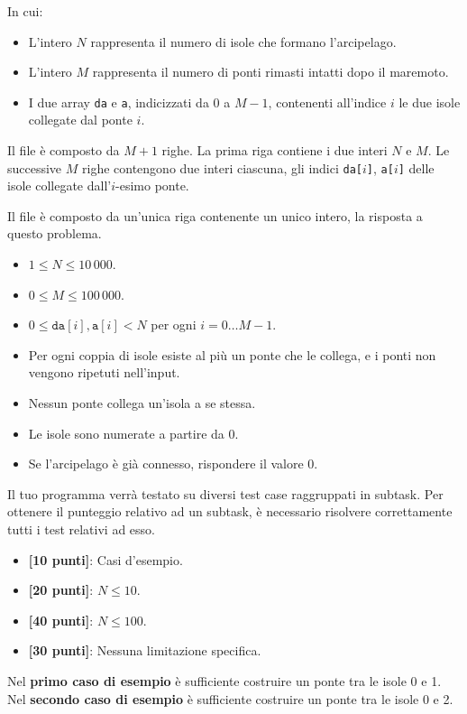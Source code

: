 In cui:
\begin{itemize}[nolistsep]
  \item L'intero $N$ rappresenta il numero di isole che formano l'arcipelago.
  \item L'intero $M$ rappresenta il numero di ponti rimasti intatti dopo il maremoto.
  \item I due array \texttt{da} e \texttt{a}, indicizzati da $0$ a $M-1$, contenenti all'indice $i$ le due isole collegate dal ponte $i$.
\end{itemize}

\InputFile
Il file  è composto da $M+1$ righe. La prima riga contiene i due interi $N$ e $M$. Le successive $M$ righe contengono due interi ciascuna, gli indici \texttt{da[$i$]}, \texttt{a[$i$]} delle isole collegate dall'$i$-esimo ponte.

\OutputFile
Il file \outputfile{} è composto da un'unica riga contenente un unico intero, la risposta a questo problema.

\Constraints
\begin{itemize}[nolistsep, itemsep=2mm]
	\item $1 \le N \le 10\,000$.
	\item $0 \le M \le 100\,000$.
	\item $0 \le \texttt{da}[i], \texttt{a}[i] < N$ per ogni $i=0\ldots M-1$.
	\item Per ogni coppia di isole esiste al più un ponte che le collega, e i ponti non vengono ripetuti nell'input.
	\item Nessun ponte collega un'isola a se stessa.
	\item Le isole sono numerate a partire da 0.
	\item Se l'arcipelago è già connesso, rispondere il valore 0.
\end{itemize}

\Scoring
Il tuo programma verrà testato su diversi test case raggruppati in subtask.
Per ottenere il punteggio relativo ad un subtask, è necessario risolvere
correttamente tutti i test relativi ad esso.

\begin{itemize}[nolistsep,itemsep=2mm]
  \item \textbf{ [10 punti]}: Casi d'esempio.
  \item \textbf{ [20 punti]}: $N \leq 10$.
  \item \textbf{ [40 punti]}: $N \leq 100$.
  \item \textbf{ [30 punti]}: Nessuna limitazione specifica.
\end{itemize}

\Examples
\begin{example}
%
\end{example}
\begin{example}
%
\end{example}


\Explanation
Nel \textbf{primo caso di esempio} è sufficiente costruire un ponte tra le isole 0 e 1.\\[2mm]
Nel \textbf{secondo caso di esempio} è sufficiente costruire un ponte tra le isole 0 e 2.